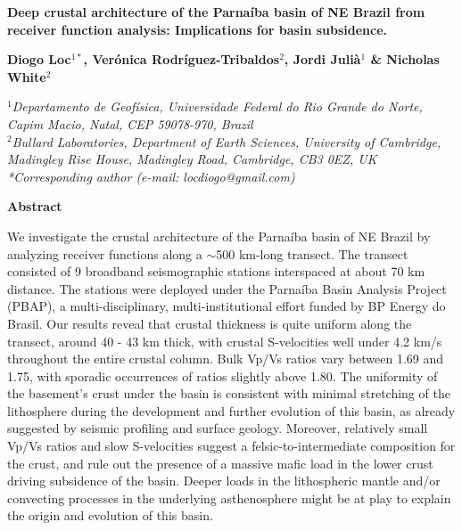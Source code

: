 \documentclass[paper,11pt]{geophysics}
\begin{document}
\begin{center}
\textbf{\LARGE
Deep crustal architecture of the Parnaíba basin of NE Brazil from receiver function analysis: Implications for basin subsidence.}
\linebreak 

\textbf{Diogo Loc$^{1*}$, Verónica Rodríguez-Tribaldos$^{2}$, Jordi Julià$^{1}$ \& Nicholas White$^{2}$}
\linebreak 

\textit{
$^{1}$Departamento de Geofísica, Universidade Federal do Rio Grande do Norte, Capim Macio, Natal, CEP 59078-970, Brazil
\\
$^{2}$Bullard Laboratories, Department of Earth Sciences, University of Cambridge, Madingley Rise House, Madingley Road, Cambridge, CB3 0EZ, UK
\\
*Corresponding author (e-mail: locdiogo@gmail.com)
}
\linebreak 

\end{center}
 
\begin{flushleft}
\textbf{\LARGE Abstract}
\end{flushleft}

We investigate the crustal architecture of the Parnaíba basin of NE Brazil by analyzing receiver functions along a $\sim$500 km-long transect. The transect consisted of 9 broadband seismographic stations interspaced at about 70 km distance. The stations were deployed under the Parnaíba Basin Analysis Project (PBAP), a multi-disciplinary, multi-institutional effort funded by BP Energy do Brasil. Our results reveal that crustal thickness is quite uniform along the transect, around 40 - 43 km thick, with crustal S-velocities well under 4.2 km/s throughout the entire crustal column. Bulk Vp/Vs ratios vary between 1.69 and 1.75, with sporadic occurrences of ratios slightly above 1.80. The uniformity of the basement's crust under the basin is consistent with minimal stretching of the lithosphere during the development and further evolution of this basin, as already suggested by seismic profiling and surface geology. Moreover, relatively small Vp/Vs ratios and slow S-velocities suggest a felsic-to-intermediate composition for the crust, and rule out the presence of a massive mafic load in the lower crust driving subsidence of the basin. Deeper loads in the lithospheric mantle and/or convecting processes in the underlying asthenosphere might be at play to explain the origin and evolution of this basin.
\linebreak 
\linebreak 
\end{document}
